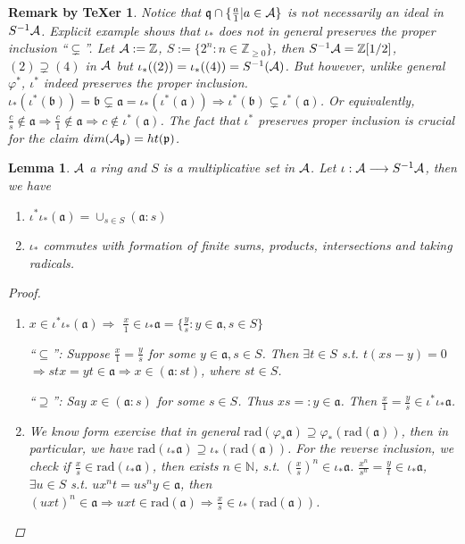 \documentclass[11pt]{article}
\newtheorem{lemma}[thm]{Lemma}
\newtheorem{rmkt}[thm]{Remark by TeXer}
\newcommand{\intg}{\mathbb Z}
\newcommand{\sca}{{\mathfrak a}}
\newcommand{\scb}{{\mathfrak b}}
\newcommand{\scp}{{\mathfrak p}}
\newcommand{\scq}{\mathfrak q}
\newcommand{\cala}{{\cal A}}
\newcommand{\Lrta}{\Longrightarrow}
\newcommand{\lrta}{\longrightarrow}
\begin{document}
\begin{rmkt}
  Notice that $\scq\cap\{\frac{a}{1}|a\in\cala\}$ is not necessarily an ideal in $S^{-1}\cala$. Explicit example shows that $\iota_*$ does not in general preserves the proper inclusion ``$\subsetneq$''. Let $\cala:=\intg$, $S:=\{2^n:n\in \intg_{\geq 0}\}$, then $S^{-1}\cala=\intg[1/2]$, $(2)\supsetneq (4)$ in $\cala$ but $\iota_*((2))=\iota_*((4))=S^{-1}(\cala)$. But however, unlike general $\varphi^*$, $\iota^*$ indeed preserves the proper inclusion. $\iota_*(\iota^*(\scb))=\scb\subsetneq \sca=\iota_*(\iota^*(\sca))\Lrta \iota^*(\scb)\subsetneq \iota^*(\sca)$. Or equivalently, $\frac{c}{s}\notin \sca\Lrta \frac{c}{1}\notin\sca\Lrta c\notin\iota^*(\sca)$. The fact that $\iota^*$ preserves proper inclusion is crucial for the claim $dim(\cala_\scp)=ht(\scp)$.
\end{rmkt}

{\color{red}
\begin{lemma}\label{lem:radical_commutates_localization}
$\cala$ a ring and $S$ is a multiplicative set in $\cala$. Let $\iota:\cala\lrta S^{-1}\cala$, then we have
\begin{enumerate}[label=(\alph*)]
\item $\iota^*\iota_*(\sca)=\cup_{s\in S}(\sca:s)$
\item $\iota_*$ commutes with formation of finite sums, products, intersections and taking radicals.
\end{enumerate}
\begin{proof}
\begin{enumerate}[label=(\alph*)]
\item 
$x\in \iota^*\iota_*(\sca)\Lrta $ $\frac{x}{1}\in\iota_*\sca=\{\frac{y}{s}:y\in\sca,s\in S\}$

``$\subseteq$'': Suppose $\frac{x}{1}=\frac{y}{s}$ for some $y\in\sca,s\in S$. Then $\exists t\in S$ s.t. $t(xs-y)=0$ $\Lrta stx=yt \in \sca\Lrta x\in (\sca:st)$, where $st\in S$.

``$\supseteq$'': Say $x\in (\sca:s)$ for some $s\in S$. Thus $xs=:y \in\sca$. Then $\frac{x}{1}=\frac{y}{s}\in \iota^*\iota_*\sca$. 
\item We know form exercise that in general $\text{rad}(\varphi_*\sca)\supseteq\varphi_*(\text{rad}(\sca))$, then in particular, we have $\text{rad}(\iota_*\sca)\supseteq\iota_*(\text{rad}(\sca))$. For the reverse inclusion, we check if $\frac{x}{s}\in \text{rad}(\iota_*\sca)$, then exists $n\in\mathbb{N}$, s.t. $\left(\frac{x}{s}\right)^n\in \iota_*\sca$. $\frac{x^n}{s^n}=\frac{y}{t}\in\iota_*\sca$, $\exists u\in S$ s.t. $u x^n t=u s^n y\in\sca$, then $(uxt)^n\in\sca\Lrta uxt\in\text{rad}(\sca)\Lrta \frac{x}{s}\in \iota_*(\text{rad}(\sca))$.
\end{enumerate}
\end{proof}
\end{lemma}
}
\end{document}
